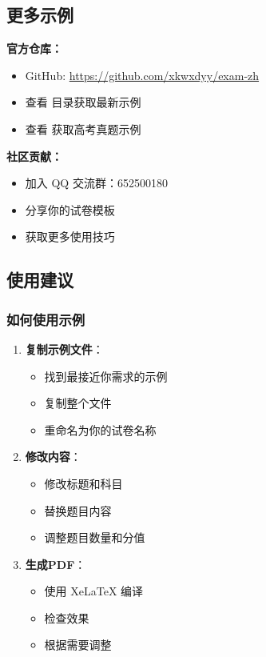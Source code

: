 \subsection{更多示例}

\textbf{官方仓库：}
\begin{itemize}
  \item GitHub: \url{https://github.com/xkwxdyy/exam-zh}
  \item 查看  目录获取最新示例
  \item 查看  获取高考真题示例
\end{itemize}

\textbf{社区贡献：}
\begin{itemize}
  \item 加入 QQ 交流群：652500180
  \item 分享你的试卷模板
  \item 获取更多使用技巧
\end{itemize}

\subsection{使用建议}

\subsubsection{如何使用示例}

\begin{enumerate}
  \item \textbf{复制示例文件}：
    \begin{itemize}
      \item 找到最接近你需求的示例
      \item 复制整个文件
      \item 重命名为你的试卷名称
    \end{itemize}

  \item \textbf{修改内容}：
    \begin{itemize}
      \item 修改标题和科目
      \item 替换题目内容
      \item 调整题目数量和分值
    \end{itemize}

  \item \textbf{生成PDF}：
    \begin{itemize}
      \item 使用 XeLaTeX 编译
      \item 检查效果
      \item 根据需要调整
    \end{itemize}
\end{enumerate}

